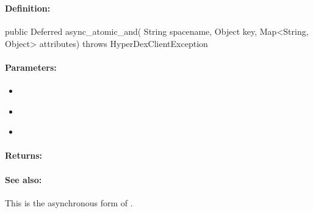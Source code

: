 \pagebreak
\subsubsection{}
\label{api:java:async_atomic_and}


\paragraph{Definition:}
\begin{javacode}
public Deferred async_atomic_and(
        String spacename,
        Object key,
        Map<String, Object> attributes) throws HyperDexClientException
\end{javacode}

\paragraph{Parameters:}
\begin{itemize}[noitemsep]
\item {}\\

\item {}\\

\item {}\\

\end{itemize}

\paragraph{Returns:}


\paragraph{See also:}  This is the asynchronous form of .

\pagebreak
\subsubsection{}
\label{api:java:cond_atomic_and}


